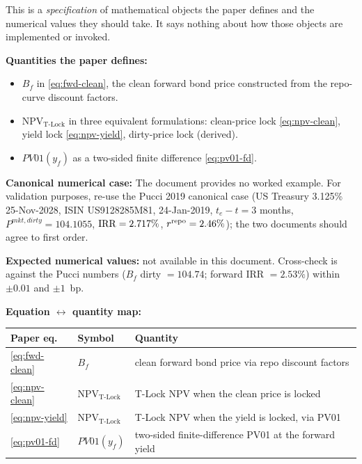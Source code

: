 \documentclass[11pt,a4paper]{article}
\begin{document}
\begin{validation}
This is a \emph{specification} of mathematical objects the paper
defines and the numerical values they should take. It says nothing
about how those objects are implemented or invoked.

\textbf{Quantities the paper defines:}
\begin{itemize}[noitemsep]
  \item $B_f$ in \eqref{eq:fwd-clean}, the clean forward bond price
        constructed from the repo-curve discount factors.
  \item $\mathrm{NPV}_{\text{T-Lock}}$ in three equivalent
        formulations: clean-price lock \eqref{eq:npv-clean},
        yield lock \eqref{eq:npv-yield}, dirty-price lock (derived).
  \item $PV01(y_f)$ as a two-sided finite difference
        \eqref{eq:pv01-fd}.
\end{itemize}

\textbf{Canonical numerical case:}
The document provides no worked example. For validation purposes,
re-use the Pucci 2019 canonical case (US Treasury 3.125\% 25-Nov-2028,
ISIN US9128285M81, 24-Jan-2019, $t_e - t = 3$ months,
$P^{mkt,dirty} = 104.1055$, $\mathrm{IRR} = 2.717\%$, $r^{\mathrm{repo}} = 2.46\%$); the
two documents should agree to first order.

\textbf{Expected numerical values:} not available in this document.
Cross-check is against the Pucci numbers ($B_f$ dirty $= 104.74$;
forward IRR $= 2.53\%$) within $\pm 0.01$ and $\pm 1$~bp.

\textbf{Equation $\leftrightarrow$ quantity map:}

\smallskip
\begin{tabular}{@{}p{2.8cm}p{3.8cm}p{6.2cm}@{}}
\toprule
Paper eq.                & Symbol                                & Quantity \\
\midrule
\eqref{eq:fwd-clean}     & $B_f$                                 & clean forward bond price via repo discount factors \\
\eqref{eq:npv-clean}     & $\mathrm{NPV}_{\text{T-Lock}}$        & T-Lock NPV when the clean price is locked \\
\eqref{eq:npv-yield}     & $\mathrm{NPV}_{\text{T-Lock}}$        & T-Lock NPV when the yield is locked, via PV01 \\
\eqref{eq:pv01-fd}       & $PV01(y_f)$                           & two-sided finite-difference PV01 at the forward yield \\
\bottomrule
\end{tabular}
\smallskip


\end{validation}
\end{document}
